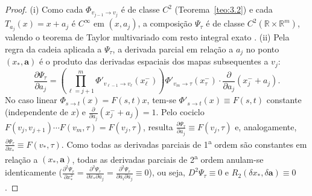 \documentclass[11pt, a4paper]{article}
\theoremstyle{definition}
\theoremstyle{plain}
\theoremstyle{remark}
\begin{document}
\begin{proof}
(i) Como cada $\Phi_{v_{j-1} \to v_j}$ é de classe $C^2$ (Teorema~\ref{teo:3.2}) e cada $T_{a_j}(x) = x + a_j$ é $C^\infty$ em $(x, a_j)$, a composição $\Psi_\tau$ é de classe $C^2(\mathbb{R} \times \mathbb{R}^m)$, valendo o teorema de Taylor multivariado com resto integral exato \cite[vol.~2]{LimaAnalise2}.
(ii) Pela regra da cadeia aplicada a $\Psi_\tau$, a derivada parcial em relação a $a_j$ no ponto $(x_*, \mathbf{a})$ é o produto das derivadas espaciais dos mapas subsequentes a $v_j$:
\[
\frac{\partial \Psi_\tau}{\partial a_j} = \left(\prod_{\ell = j+1}^{m} \Phi'_{v_{\ell-1} \to v_\ell}(x_\ell^-)\right) \Phi'_{v_m \to \tau}(x_\tau^-) \cdot \frac{\partial}{\partial a_j}(x_j^- + a_j).
\]
No caso linear $\Phi_{s \to t}(x) = F(s,t)x$, tem-se $\Phi'_{s \to t}(x) \equiv F(s,t)$ constante (independente de $x$) e $\frac{\partial}{\partial a_j}(x_j^- + a_j) = 1$. Pelo cociclo $F(v_j, v_{j+1})\cdots F(v_m, \tau) = F(v_j, \tau)$, resulta $\frac{\partial \Psi_\tau}{\partial a_j} \equiv F(v_j, \tau)$ e, analogamente, $\frac{\partial \Psi_\tau}{\partial x_*} \equiv F(v_*, \tau)$. Como todas as derivadas parciais de 1\textsuperscript{a} ordem são constantes em relação a $(x_*, \mathbf{a})$, todas as derivadas parciais de 2\textsuperscript{a} ordem anulam-se identicamente ($\frac{\partial^2 \Psi_\tau}{\partial x_*^2} = \frac{\partial^2 \Psi_\tau}{\partial x_* \partial a_j} = \frac{\partial^2 \Psi_\tau}{\partial a_i \partial a_j} \equiv 0$), ou seja, $D^2 \Psi_\tau \equiv 0$ e $R_2(\delta x_*, \delta\mathbf{a}) \equiv 0$.
\end{proof}
\end{document}
